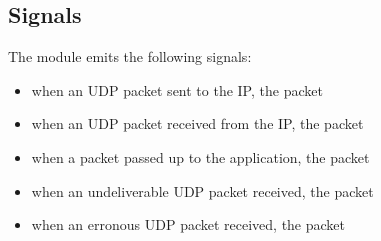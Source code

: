 
\subsection{Signals}

The  module emits the following signals:
\begin{itemize}
  \item {} when an UDP packet sent to the IP, the packet
  \item {} when an UDP packet received from the IP, the packet
  \item {} when a packet passed up to the application, the packet
  \item {} when an undeliverable UDP packet received, the packet
  \item {} when an erronous UDP packet received, the packet
\end{itemize}

